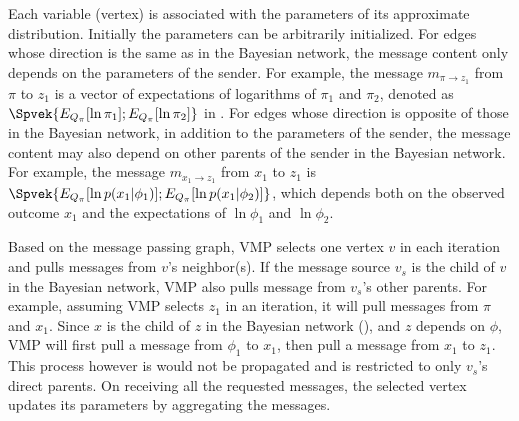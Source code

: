  


Each variable (vertex) is associated with the parameters of its
approximate distribution. Initially the parameters can be arbitrarily
initialized. For edges whose direction is the same as in the Bayesian network,
the message content only depends on the parameters of the sender.  
For example, the
message $m_{\pi \rightarrow z_1}$ from $\pi$ to $z_1$ is a vector of expectations of logarithms of
$\pi_1$ and $\pi_2$,
denoted as $\Spvek{E_{Q_\pi}[\ln \pi_1];E_{Q_\pi}[\ln \pi_2]}$ in .
For edges whose direction is opposite of those in the
Bayesian network, %
in addition to the parameters of the sender, 
the message content may also depend on other parents of the sender in the Bayesian network. 
For example, the message $m_{x_1 \rightarrow z_1}$ from $x_1$ to $z_1$ is
$\Spvek{E_{Q_\pi}[\ln p(x_1 | \phi_1)];E_{Q_\pi}[\ln p(x_1 | \phi_2)]}$,
which depends both on the observed outcome $x_1$ and the
expectations of $\ln \phi_1$ and $\ln \phi_2$.  

Based on the message passing graph,
VMP selects one vertex $v$ in each iteration and 
pulls messages from $v$'s neighbor(s).
If the message source $v_s$ is the child of $v$ in the Bayesian network,
VMP also pulls message from $v_s$'s other parents. 
For example, assuming VMP selects $z_1$ in an iteration,
it will pull messages from $\pi$ and $x_1$.
Since $x$ is the child of $z$ in the Bayesian network (), 
and $z$ depends on $\phi$,
VMP will first pull a message from $\phi_1$ to $x_1$,
then pull a message from $x_1$ to $z_1$.
This process however is would not be propagated and is restricted to 
only $v_s$'s direct parents.
On receiving all the requested messages, 
the selected vertex updates its parameters by aggregating the messages. 

